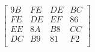 \[
  \begin{bmatrix}
    9B & FE & DE & BC \\
    FE & DE & EF & 86 \\
    EE & 8A & B8 & CC \\
    DC & B9 & 81 & F2 \\
  \end{bmatrix}
\]